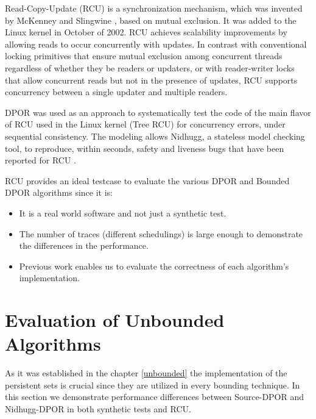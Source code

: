Read-Copy-Update (RCU) is a synchronization mechanism, which was invented by McKenney and Slingwine \cite{McKenney98},
based on mutual exclusion. It was added to the Linux kernel in October of 2002. RCU achieves scalability improvements by
allowing reads to occur concurrently with updates. In contrast with conventional locking primitives that ensure mutual
exclusion among concurrent threads regardless of whether they be readers or updaters, or with reader-writer locks that
allow concurrent reads but not in the presence of updates, RCU supports concurrency between a single updater and
multiple readers. 

DPOR was used as an approach to systematically test the code of the main flavor of RCU used in the Linux kernel (Tree
RCU) for concurrency errors, under sequential consistency. The modeling allows Nidhugg, a stateless model checking tool,
to reproduce, within seconds, safety and liveness bugs that have been reported for RCU \cite{Spin}.

RCU provides an ideal testcase to evaluate the various DPOR and Bounded DPOR algorithms since it is:
\begin{itemize}
\item It is a real world software and not just a synthetic test.
\item The number of traces (different schedulings) is large enough to demonstrate the differences in the performance.
\item Previous work \cite{Spin} enables us to evaluate the correctness of each algorithm's implementation.
\end{itemize}


\section{Evaluation of Unbounded Algorithms}
As it was established in the chapter \ref{unbounded} the implementation of the persistent sets is crucial since they are
utilized in every bounding technique. In this section we demonstrate performance differences between Source-DPOR and
Nidhugg-DPOR in both synthetic tests and RCU.

